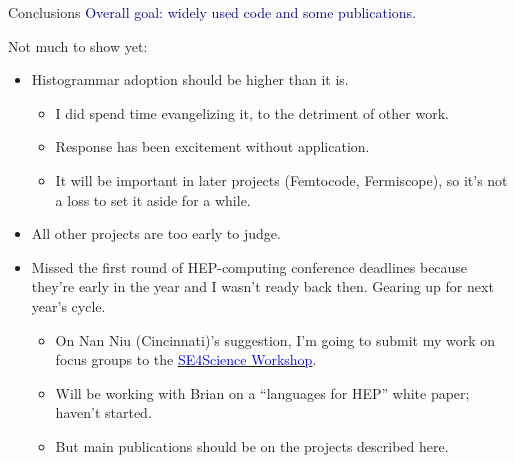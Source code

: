 \documentclass{beamer}
\begin{document}
\begin{frame}{Conclusions}
\vspace{0.5 cm}
\textcolor{darkblue}{Overall goal: widely used code and some publications.}

\vspace{0.25 cm}
Not much to show yet:

\begin{itemize}
\item Histogrammar adoption should be higher than it is.
\begin{itemize}
\item I did spend time evangelizing it, to the detriment of other work.
\item Response has been excitement without application.
\item It will be important in later projects (Femtocode, Fermiscope), so it's not a loss to set it aside for a while.
\end{itemize}

\item All other projects are too early to judge.

\item Missed the first round of HEP-computing conference deadlines because they're early in the year and I wasn't ready back then. Gearing up for next year's cycle.
\begin{itemize}
\item On Nan Niu (Cincinnati)'s suggestion, I'm going to submit my work on focus groups to the \href{http://se4science.org/workshops/}{\textcolor{blue}{SE4Science Workshop}}.
\item Will be working with Brian on a ``languages for HEP'' white paper; haven't started.
\item But main publications should be on the projects described here.
\end{itemize}
\end{itemize}
\end{frame}
\end{document}

